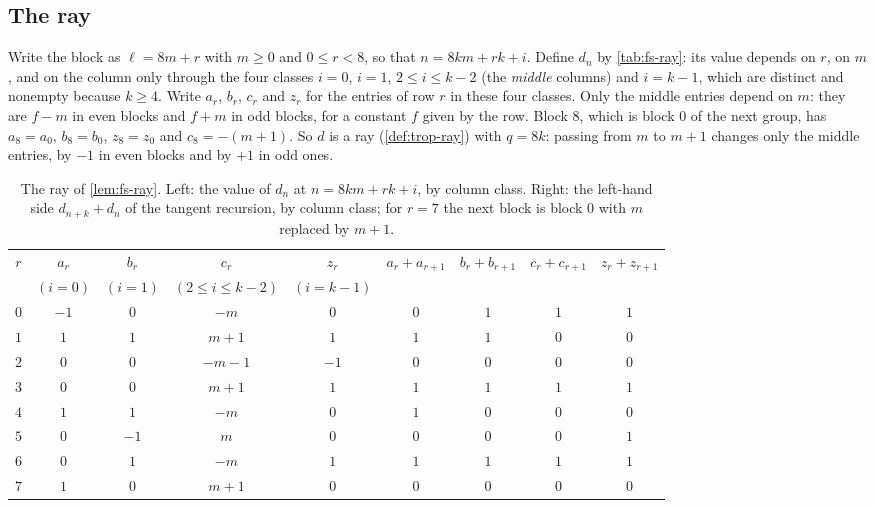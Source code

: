 \subsection{The ray}

Write the block as $\ell=8m+r$ with $m\ge0$ and $0\le r<8$, so that
$n=8km+rk+i$. Define $d_n$ by \autoref{tab:fs-ray}: its value depends on $r$, on
$m$, and on the column only through the four classes $i=0$, $i=1$,
$2\le i\le k-2$ (the \textit{middle} columns) and $i=k-1$, which are distinct and
nonempty because $k\ge4$. Write $a_r$, $b_r$, $c_r$ and $z_r$ for the entries of
row $r$ in these four classes. Only the middle entries depend on $m$: they are
$f-m$ in even blocks and $f+m$ in odd blocks, for a constant $f$ given by the row.
Block $8$, which is block $0$ of the next group, has $a_8=a_0$, $b_8=b_0$,
$z_8=z_0$ and $c_8=-(m+1)$. So $d$ is a ray (\autoref{def:trop-ray}) with $q=8k$: passing from $m$ to $m+1$ changes only the
middle entries, by $-1$ in even blocks and by $+1$ in odd ones.

\begin{table}
\centering
\small
\setlength{\tabcolsep}{4pt}
\begin{tabular}{c|cccc|cccc}
$r$ & $a_r$ & $b_r$ & $c_r$ & $z_r$ &
$a_r+a_{r+1}$ & $b_r+b_{r+1}$ & $c_r+c_{r+1}$ & $z_r+z_{r+1}$\\
& $(i=0)$ & $(i=1)$ & $(2\le i\le k-2)$ & $(i=k-1)$ &&&&\\
\hline
$0$ & $-1$ & $0$ & $-m$ & $0$ & $0$ & $1$ & $1$ & $1$\\
$1$ & $1$ & $1$ & $m+1$ & $1$ & $1$ & $1$ & $0$ & $0$\\
$2$ & $0$ & $0$ & $-m-1$ & $-1$ & $0$ & $0$ & $0$ & $0$\\
$3$ & $0$ & $0$ & $m+1$ & $1$ & $1$ & $1$ & $1$ & $1$\\
$4$ & $1$ & $1$ & $-m$ & $0$ & $1$ & $0$ & $0$ & $0$\\
$5$ & $0$ & $-1$ & $m$ & $0$ & $0$ & $0$ & $0$ & $1$\\
$6$ & $0$ & $1$ & $-m$ & $1$ & $1$ & $1$ & $1$ & $1$\\
$7$ & $1$ & $0$ & $m+1$ & $0$ & $0$ & $0$ & $0$ & $0$\\
\end{tabular}
\caption{The ray of \autoref{lem:fs-ray}. Left: the value of $d_n$ at
$n=8km+rk+i$, by column class. Right: the left-hand side $d_{n+k}+d_n$ of the
tangent recursion, by column class; for $r=7$ the next block is block $0$ with $m$
replaced by $m+1$.}
\label{tab:fs-ray}
\end{table}

